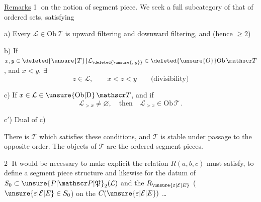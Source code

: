 \uline{Remarks} \textcircled{1}  on the notion of segment piece. We seek a full subcategory  of that of ordered sets, satisfying

a) Every $\mathcal L\in\mathrm{Ob}\,\mathscr T$ is upward filtering and downward filtering, and   (hence $\geq2$)

b) If $x,y\in\deleted{\unsure{T}}\mathcal L_{\deleted{\unsure{,|g}}}\in\deleted{\unsure{O}}\mathrm{Ob}\,\mathscr T$, and $x<y$, $\exists$
\[
 z\in\mathcal L,\qquad x<z<y\qquad\text{(divisibility)}
\]

c) If $x\in\mathcal L\in\unsure{\mathrm{Ob}|\mathrm D}\,\mathscr T$,  and if
\[
 \mathcal L_{>x}\ne\varnothing,\quad\text{then}\quad \mathcal L_{>x}\in\mathrm{Ob}\,\mathscr T\,.
\]

c$'$) Dual of c)

There is   $\mathscr T$ which satisfies these conditions, and $\mathscr T$ is stable under passage to the opposite order. The objects of $\mathscr T$ are the ordered segment pieces.

\textcircled{2} It would be necessary to make explicit   the relation $R(a,b,c)$ must satisfy, to define a  segment piece structure\unsure{,} and likewise for the datum of $S_0\subset\unsure{P|\mathscr P|\mathfrak P}_2(\mathcal L)$ and the $R_{\unsure{\varepsilon|\mathcal E|E}}$\unsure{,} ($\unsure{\varepsilon|\mathcal E|E}\in S_0$) on the $C(\unsure{\varepsilon|\mathcal E|E})$ \ldots

